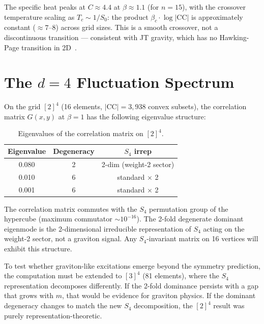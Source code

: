 \documentclass[aps,prd,twocolumn,superscriptaddress]{revtex4-2}
\begin{document}
The specific heat peaks at $C \approx 4.4$ at $\beta \approx 1.1$
(for $n = 15$), with the crossover temperature scaling as
$T_c \sim 1/S_0$: the product $\beta_c \cdot \log|\mathrm{CC}|$ is
approximately constant ($\approx 7$--$8$) across grid sizes. This is
a smooth crossover, not a discontinuous transition --- consistent
with JT gravity, which has no Hawking-Page transition in
2D~\cite{Saad2019}.


\section{The $d = 4$ Fluctuation Spectrum}
\label{sec:d4}

On the grid $[2]^4$ (16 elements, $|\mathrm{CC}| = 3{,}938$ convex
subsets), the correlation matrix $G(x,y)$ at $\beta = 1$ has the
following eigenvalue structure:

\begin{table}[h]
\caption{Eigenvalues of the correlation matrix on $[2]^4$.}
\label{tab:eigenvalues}
\begin{ruledtabular}
\begin{tabular}{ccc}
Eigenvalue & Degeneracy & $S_4$ irrep \\
\midrule
0.080 & 2 & 2-dim (weight-2 sector) \\
0.010 & 6 & standard $\times$ 2 \\
0.001 & 6 & standard $\times$ 2 \\
\end{tabular}
\end{ruledtabular}
\end{table}

The correlation matrix commutes with the $S_4$ permutation group of
the hypercube (maximum commutator $\sim 10^{-16}$). The 2-fold
degenerate dominant eigenmode is the 2-dimensional irreducible
representation of $S_4$ acting on the weight-2 sector, not a
graviton signal. Any $S_4$-invariant matrix on 16 vertices will
exhibit this structure.

To test whether graviton-like excitations emerge beyond the symmetry
prediction, the computation must be extended to $[3]^4$ (81
elements), where the $S_4$ representation decomposes differently.
If the 2-fold dominance persists with a gap that grows with $m$,
that would be evidence for graviton physics. If the dominant
degeneracy changes to match the new $S_4$ decomposition, the
$[2]^4$ result was purely representation-theoretic.
\end{document}
